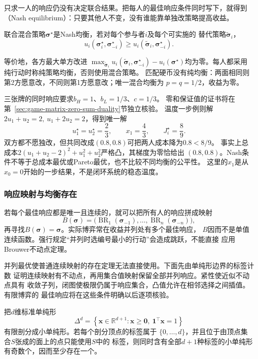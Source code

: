 只求一人的响应仍没有决定联合结果。把每人的最佳响应条件同时写下，就得到
（Nash equilibrium）：只要其他人不变，没有谁能靠单独改策略提高收益。
\begin{definition}[Nash均衡]
\label{def:game-nash-equilibrium}
联合混合策略\(\bm\sigma^\star\)是Nash均衡，若对每个参与者\(i\)及每个可实施的
替代策略\(\widetilde{\bm\sigma}_i\)，
\begin{equation}
  u_i(\bm\sigma_i^\star,\bm\sigma_{-i}^\star)
  \geq u_i(\widetilde{\bm\sigma}_i,\bm\sigma_{-i}^\star).
  \label{eq:game-nash-no-unilateral-deviation}
\end{equation}
\end{definition}
等价地，各方最大单方改进
\(\max_{\widetilde{\bm\sigma}_i}u_i(\widetilde{\bm\sigma}_i,\bm\sigma_{-i}^\star)
-u_i(\bm\sigma^\star)\)均为零。每人都采用纯行动时称纯策略均衡，否则使用混合策略。
匹配硬币没有纯均衡：两面相同则第2方愿意改，不同则第1方愿意改；唯一混合均衡为
\(p=q=1/2\)，收益为零。

三张牌的同时响应要求\(b_H=1\)、\(b_L=1/3\)、\(c=1/3\)。
零和保证值的证书将在第~\ref{sec:game-matrix-zero-sum-duality}节独立核验。
温度一步例则解
\(2u_1+u_2=2,\ u_1+2u_2=2\)，得到唯一解
\[
  u_1^\star=u_2^\star=\frac23,\qquad x_1=\frac43,\qquad J_i^\star=\frac89.
\]
双方都不愿独改，但共同改成\((0.8,0.8)\)可把两人成本降为\(0.8<8/9\)。
事实上总成本\(2(u_1+u_2-2)^2+u_1^2+u_2^2\)严格凸，其梯度为零恰给出
\((0.8,0.8)\)。Nash条件不等于总成本最优或Pareto最优，也不比较不同均衡的公平性。
这里的\(x_1\)是从\(x_0=0\)开始的一步结果，不是闭环系统的稳态温度。

\subsubsection{响应映射与均衡存在}
\label{sec:game-equilibrium-existence}

若每个最佳响应都是唯一且连续的，就可以把所有人的响应拼成映射
\[
  B(\bm{\sigma})
  =
  \bigl(
    \operatorname{BR}_1(\bm{\sigma}_{-1}),\ldots,
    \operatorname{BR}_n(\bm{\sigma}_{-n})
  \bigr),
\]
再寻找\(B(\bm{\sigma})=\bm{\sigma}\)。实际博弈常在收益并列处有多个最佳响应，
\(B\)因而不是单值连续函数。强行规定“并列时选编号最小的行动”会造成跳跃，不能直接
应用Brouwer不动点定理。

并列最优使普通连续映射的存在定理无法直接使用。下面先由单纯形边界的标签计数
证明连续映射有不动点，再用集合值映射保留全部并列响应。紧性使近似不动点具有
收敛子列，闭图使极限仍属于响应集合，凸值允许在相邻选择之间插值。有限博弈的
最佳响应将在这些条件明确以后逐项核验。
\begin{lemma}[Sperner引理]
\label{lem:game-sperner}
把\(d\)维标准单纯形
\[
  \Delta^d
  =
  \left\{
    \bm{x}\in\mathbb{R}^{d+1}:
    \bm{x}\geq\bm{0},\
    \bm{1}^{\top}\bm{x}=1
  \right\}
\]
有限剖分成小单纯形。若每个剖分顶点的标签属于
\(\{0,\ldots,d\}\)，并且位于由顶点集合\(S\)张成的面上的点只能使用\(S\)中的
标签，则同时含有全部\(d+1\)种标签的小单纯形有奇数个，因而至少存在一个。
\end{lemma}

